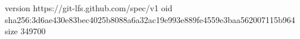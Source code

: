 version https://git-lfs.github.com/spec/v1
oid sha256:3d6ae430e83bec4025b8088a6a32ac19e993e889fe4559e3baa562007115b964
size 349700
